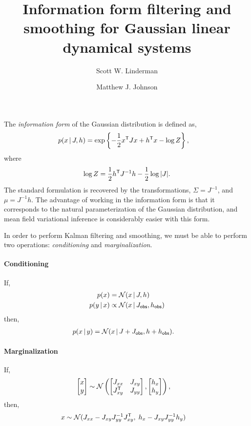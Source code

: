\documentclass{article}
\title{Information form filtering and smoothing for Gaussian linear dynamical systems}
\author{Scott W. Linderman 
  \and
  Matthew J. Johnson 
}
\begin{document}
\singlespacing
\maketitle
\onehalfspacing

The \emph{information form} of the Gaussian distribution is defined as,
\begin{align}
  p(x \,|\, J, h) 
  &=  \exp \left \{ -\frac{1}{2} x^{\mathsf{T}} J x + h^{\mathsf{T}} x - \log Z \right \},
\end{align}
where
\begin{align}
  \log Z = \frac{1}{2} h^{\mathsf{T}} J^{-1} h - \frac{1}{2}\log |J|.
\end{align}
The standard formulation is recovered by the transformations,  $\Sigma = J^{-1}$, and
$\mu = J^{-1} h$. The advantage of working in the information form is that 
it corresponds to the natural parameterization of the Gaussian distribution, and
mean field variational inference is considerably easier with this form.

In order to perform Kalman filtering and smoothing, we must be able to perform
two operations: \emph{conditioning} and \emph{marginalization}. 

\paragraph{Conditioning}
If,
\begin{align}
  p(x) &= \mathcal{N}(x \,|\, J, h) \\
  p(y \,|\, x) &\propto \mathcal{N}(x \,|\, J_{\sf obs}, h_{\sf obs}) 
\end{align}
then,
\begin{align}
  p(x \,|\, y) &= \mathcal{N}(x \,|\, J + J_{\sf obs}, h + h_{\sf obs}).
\end{align}

\paragraph{Marginalization}
If,
\begin{align}
  \begin{bmatrix} x \\ y  \end{bmatrix}
  &\sim
  \mathcal{N} \left(
  \begin{bmatrix} 
    J_{xx}        & J_{xy} \\
    J_{xy}^{\mathsf{T}} & J_{yy} 
  \end{bmatrix},
  \begin{bmatrix} h_{x} \\ h_y \end{bmatrix}
  \right),
\end{align}
then,
\begin{align}
  x &\sim \mathcal{N}(
        J_{xx} - J_{xy}J_{yy}^{-1} J_{xy}^{\mathsf{T}}, \;
        h_x - J_{xy} J_{yy}^{-1} h_y)
\end{align}
\end{document}
